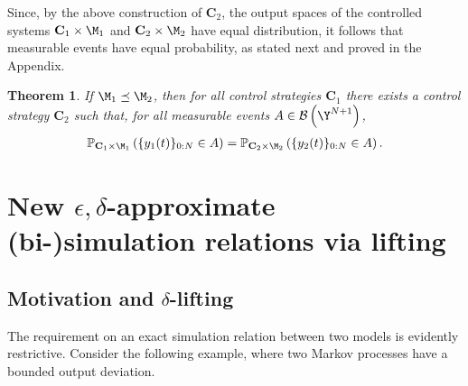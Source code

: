 \documentclass[letterpaper, 10 pt, conference]{amsart}
\newtheorem{theorem}{Theorem}
\theoremstyle{definition}
\theoremstyle{example}
\theoremstyle{remark}
\newcommand{\po}{\mathbb{P}}     \newcommand{\p}[1]{\po\left(#1\right)}     \newcommand{\pd}[1]{p\left(#1\right)}     \newcommand{\borel}[1]{\mathcal{B}\left(#1\right)}
\newcommand{\C}{{\mathbf{C}}}
\begin{document}
Since, by the above construction of $\C_2$, 
the output spaces of the controlled systems $\C_1\times\M_1$ and $\C_2\times \M_2$ have equal distribution, 
it follows that measurable events have equal probability, as stated next and proved in the Appendix. 

\begin{theorem}\label{thm:events} 
If $\M_1\preceq \M_2$, then for all control strategies $\C_1$ there exists a control strategy $\C_2$ such that, 
for all measurable events $A\in \mathcal{B}\left(\Y^{N+1}\right)$,  
\begin{align*}
 \po_{\C_1\times\M_1}\left(\{y_1 (t)\}_{0:N}\in A\right)= \po_{\C_2\times\M_2}\left(\{y_2 (t)\}_{0:N}\in A\right).
\end{align*}
\end{theorem}

\section{{New $\epsilon,\delta$-approximate (bi-)simulation relations via lifting}}\label{sec:epsdelta}  
\subsection{Motivation and $\delta$-lifting}
The requirement on an exact simulation relation between two models is evidently restrictive. 
Consider the following example, where two Markov processes have a bounded output deviation.  
\end{document}
